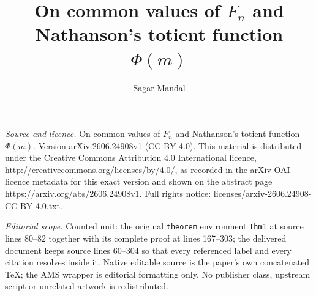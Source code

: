 \documentclass[10pt,a4paper]{amsart}
\begin{document}
\title[On common values of F_n and Nathanson's totient function Phi]{On common values of $F_n$ and Nathanson's totient function $\Phi(m)$}
\author{Sagar Mandal}
\date{}
\maketitle
\noindent\emph{Source and licence.} On common values of $F_n$ and Nathanson's totient function $\Phi(m)$. Version arXiv:2606.24908v1 (CC BY 4.0). This material is distributed under the Creative Commons Attribution 4.0 International licence, http://creativecommons.org/licenses/by/4.0/, as recorded in the arXiv OAI licence metadata for this exact version and shown on the abstract page https://arxiv.org/abs/2606.24908v1. Full rights notice: licenses/arxiv-2606.24908-CC-BY-4.0.txt.\par\smallskip
\noindent\textit{Editorial scope.} Counted unit: the original \texttt{theorem} environment \texttt{Thm1} at source lines 80--82 together with its complete proof at lines 167--303; the delivered document keeps source lines 60--304 so that every referenced label and every citation resolves inside it. Native editable source is the paper's own concatenated TeX; the AMS wrapper is editorial formatting only. No publisher class, upstream script or unrelated artwork is redistributed.
\end{document}
